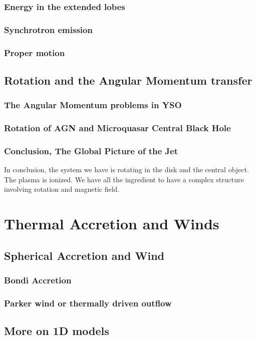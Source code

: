 \documentclass[10pt,a4paper,english]{article}
\begin{document}
\subsubsection{Energy in the extended lobes}
\subsubsection{Synchrotron emission}
\subsubsection{Proper motion}

\subsection{Rotation and the Angular Momentum transfer}
\subsubsection{The Angular Momentum problems in YSO}
\subsubsection{Rotation of AGN and Microquasar Central Black Hole}
\subsubsection{Conclusion, The Global Picture of the Jet}

In conclusion, the system we have is rotating in the disk and the central
object. The plasma is ionized. We have all the ingredient to have a complex
structure involving rotation and magnetic field.

\section{Thermal Accretion and Winds}
\subsection{Spherical Accretion and Wind}
\subsubsection{Bondi Accretion}
\subsubsection{Parker wind or thermally driven outflow}
\subsection{More on 1D models}
\end{document}
